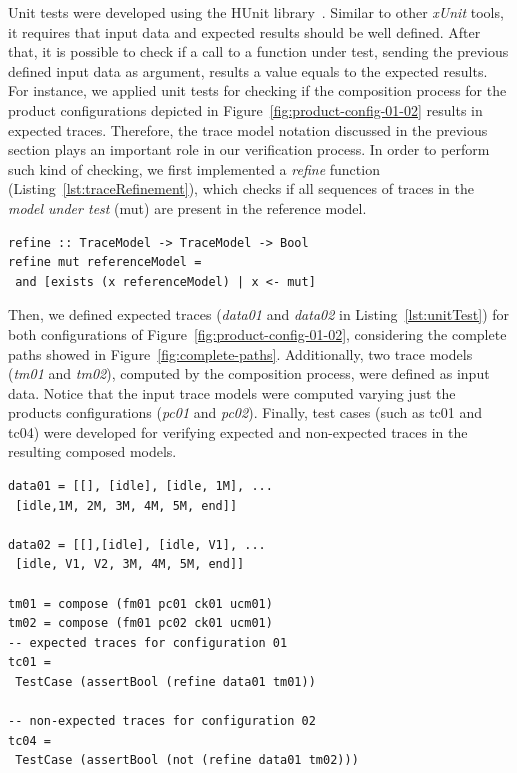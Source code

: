 \documentclass{acm_proc_article-sp}
\begin{document}
Unit tests were developed using the HUnit library~\cite{hunit-tutorial}. 
Similar to other \emph{xUnit} tools, it requires that input data and 
expected results should be well defined. After that, it is possible to check if 
a call to a function under test, sending the previous defined input data as 
argument, results a value equals to the expected results. 
For instance, we applied unit tests for checking if the composition process 
for the product configurations depicted in Figure~\ref{fig:product-config-01-02} 
results in expected traces. Therefore, the trace model notation discussed in 
the previous section plays an important role in our verification process. 
In order to perform such kind of checking, we first implemented 
a \emph{refine} function (Listing~\ref{lst:traceRefinement}), 
which checks if all sequences of traces in the \emph{model under test} (mut) are 
present in the reference model. 

\begin{lstlisting}[belowskip=10pt,frame=tb,caption={The \emph{traceRefinement} function},label=lst:traceRefinement]
refine :: TraceModel -> TraceModel -> Bool
refine mut referenceModel = 
 and [exists (x referenceModel) | x <- mut]
\end{lstlisting}

Then, we defined expected traces (\emph{data01} and 
\emph{data02} in Listing~\ref{lst:unitTest}) for both configurations 
of Figure~\ref{fig:product-config-01-02}, considering the complete paths 
showed in Figure~\ref{fig:complete-paths}. Additionally, two trace models
(\emph{tm01} and \emph{tm02}), computed by the composition process, were defined 
as input data. Notice that the input trace models were computed varying just the 
products configurations (\emph{pc01} and \emph{pc02}). 
Finally, test cases (such as tc01 and tc04) were developed 
for verifying expected and non-expected traces in the resulting composed models. 

\begin{lstlisting}[belowskip=10pt,frame=tb,caption={Unit test for composition process},label=lst:unitTest]
data01 = [[], [idle], [idle, 1M], ...
 [idle,1M, 2M, 3M, 4M, 5M, end]]

data02 = [[],[idle], [idle, V1], ...
 [idle, V1, V2, 3M, 4M, 5M, end]]

tm01 = compose (fm01 pc01 ck01 ucm01)
tm02 = compose (fm01 pc02 ck01 ucm01)
-- expected traces for configuration 01
tc01 = 
 TestCase (assertBool (refine data01 tm01))

-- non-expected traces for configuration 02
tc04 = 
 TestCase (assertBool (not (refine data01 tm02)))
\end{lstlisting}
\end{document}
